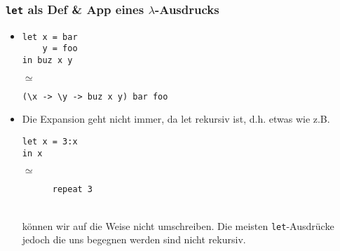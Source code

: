 \documentclass{beamer}
\begin{document}
\begin{frame}[fragile]
  \frametitle{\texttt{let} als Def \& App eines \(\lambda\)-Ausdrucks}
  \begin{itemize}
  \item
    \begin{minipage}{.3\linewidth}
\begin{Verbatim}
let x = bar 
    y = foo
in buz x y
\end{Verbatim}
    \end{minipage}
    \(\simeq\)
    \begin{minipage}{.4\linewidth}
\begin{Verbatim} 
(\x -> \y -> buz x y) bar foo
\end{Verbatim}
    \end{minipage}
  \item Die Expansion geht nicht immer, da let rekursiv ist, d.h. etwas wie z.B.
    \begin{minipage}{.3\linewidth}
\begin{Verbatim}
let x = 3:x
in x
\end{Verbatim}
    \end{minipage}
    \(\simeq\)
    \begin{minipage}{.2\linewidth}
\begin{Verbatim}
      repeat 3
\end{Verbatim}
    \end{minipage}
    \\
    können wir auf die Weise nicht umschreiben. Die meisten \texttt{let}-Ausdrücke jedoch die uns begegnen werden sind nicht rekursiv.
  \end{itemize}
\end{frame}
\end{document}
